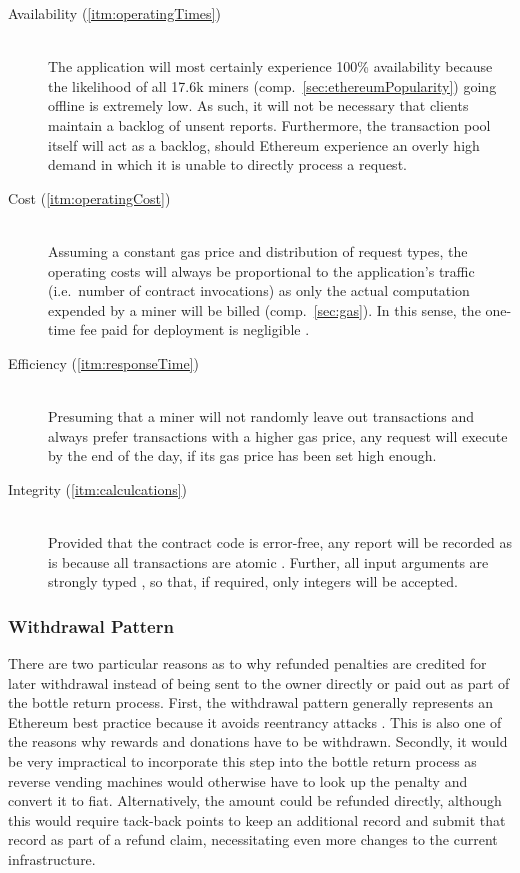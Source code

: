 \begin{description}
	\item[Availability (\ref{itm:operatingTimes})]
	\hfill \\
	The application will most certainly experience 100\% availability because the likelihood of all 17.6k miners (comp.~\ref{sec:ethereumPopularity}) going offline is extremely low. As such, it will not be necessary that clients maintain a backlog of unsent reports. Furthermore, the transaction pool itself will act as a backlog, should Ethereum experience an overly high demand in which it is unable to directly process a request.
	\item[Cost (\ref{itm:operatingCost})]
	\hfill \\
	Assuming a constant gas price and distribution of request types, the operating costs will always be proportional to the application's traffic (i.e.~number of contract invocations) as only the actual computation expended by a miner will be billed (comp.~\ref{sec:gas}). In this sense, the one-time fee paid for deployment is negligible \cite{}.
	\item[Efficiency (\ref{itm:responseTime})]
	\hfill \\
	Presuming that a miner will not randomly leave out transactions and always prefer transactions with a higher gas price, any request will execute by the end of the day, if its gas price has been set high enough. 
	\item[Integrity (\ref{itm:calculcations})]
	\hfill \\
	Provided that the contract code is error-free, any report will be recorded as is because all transactions are atomic \cite{}. Further, all input arguments are strongly typed \cite{}, so that, if required, only integers will be accepted.
\end{description}

\subsubsection{Withdrawal Pattern}
There are two particular reasons as to why refunded penalties are credited for later withdrawal instead of being sent to the owner directly or paid out as part of the bottle return process. First, the withdrawal pattern generally represents an Ethereum best practice because it avoids reentrancy attacks \cite{}. This is also one of the reasons why rewards and donations have to be withdrawn. Secondly, it would be very impractical to incorporate this step into the bottle return process as reverse vending machines would otherwise have to look up the penalty and convert it to fiat. Alternatively, the amount could be refunded directly, although this would require tack-back points to keep an additional record and submit that record as part of a refund claim, necessitating even more changes to the current infrastructure.